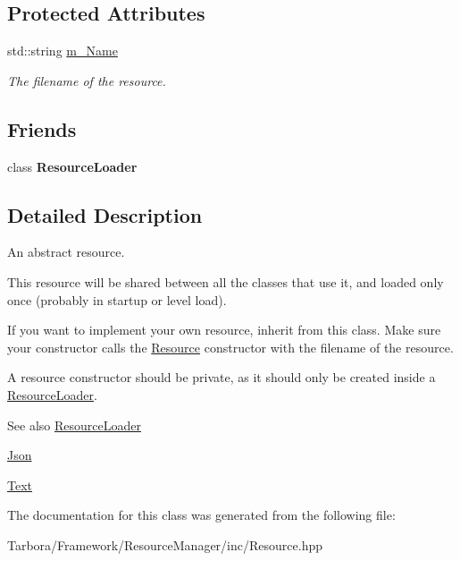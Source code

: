 \subsection*{Protected Attributes}
\begin{DoxyCompactItemize}
\item 
\mbox{\label{classTarbora_1_1Resource_ac66c4d8338373309735cfab7e8f13d97}} 
std\+::string \hyperlink{classTarbora_1_1Resource_ac66c4d8338373309735cfab7e8f13d97}{m\+\_\+\+Name}
\begin{DoxyCompactList}\small\item\em The filename of the resource. \end{DoxyCompactList}\end{DoxyCompactItemize}
\subsection*{Friends}
\begin{DoxyCompactItemize}
\item 
\mbox{\label{classTarbora_1_1Resource_a685a33b83a13f36aceea3ff940994ac9}} 
class {\bfseries Resource\+Loader}
\end{DoxyCompactItemize}


\subsection{Detailed Description}
An abstract resource. 

This resource will be shared between all the classes that use it, and loaded only once (probably in startup or level load).

If you want to implement your own resource, inherit from this class. Make sure your constructor calls the \hyperlink{classTarbora_1_1Resource}{Resource} constructor with the filename of the resource.

A resource constructor should be private, as it should only be created inside a \hyperlink{classTarbora_1_1ResourceLoader}{Resource\+Loader}.

\begin{DoxySeeAlso}{See also}
\hyperlink{classTarbora_1_1ResourceLoader}{Resource\+Loader} 

\hyperlink{classTarbora_1_1Json}{Json} 

\hyperlink{classTarbora_1_1Text}{Text} 
\end{DoxySeeAlso}


The documentation for this class was generated from the following file\+:\begin{DoxyCompactItemize}
\item 
Tarbora/\+Framework/\+Resource\+Manager/inc/Resource.\+hpp\end{DoxyCompactItemize}
